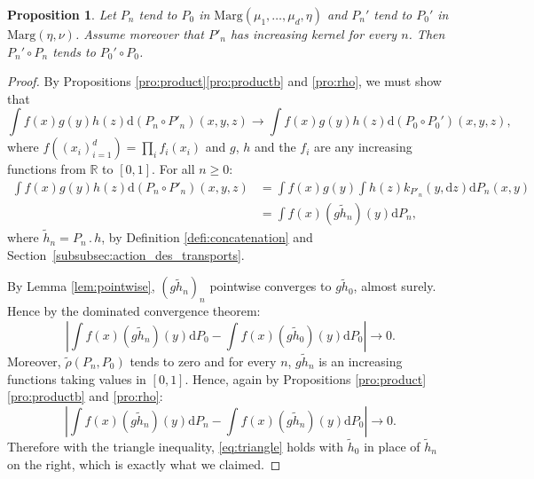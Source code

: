 \documentclass[11pt]{article}
\newcommand{\ldot}{\mathbin{.}}
\theoremstyle{plain}
\newtheorem{pro}[them]{Proposition}
\theoremstyle{definition}
\newcommand{\dd}{\mathrm{d}}
\newcommand{\ma}{\mathrm{Marg}}
\newcommand{\R}{\mathbb{R}}
\begin{document}
\begin{pro}\label{pro:continuity}
Let $P_n$ tend to $P_0$ in $\ma(\mu_1,\ldots,\mu_d,\eta)$ and $P_n'$ tend to $P_0'$ in $\ma(\eta,\nu)$. Assume moreover that $P'_n$ has increasing kernel for every $n$. Then $P_n'\circ P_n$ tends to $P_0'\circ P_0$.
\end{pro}

\begin{proof}
By Propositions \ref{pro:product}\eqref{pro:productb} and \ref{pro:rho}, we must show that\vspace*{-3pt}
\[
\int f(x)g(y)h(z)\dd (P_n\circ P'_n)(x,y,z)\to \int f(x)g(y)h(z)\dd (P_0\circ P_0')(x,y,z),
\]
where $f((x_i)_{i=1}^d)=\prod_if_i(x_i)$ and $g$, $h$ and the $f_i$ are any increasing functions from $\R$ to $[0,1]$. For all $n\geqslant0$:
\begin{align*}
\int f(x)g(y)h(z)\dd (P_n\circ P'_n)(x,y,z)&=\int f(x)g(y)\int h(z) k_{P'_n}(y,\dd z)\dd P_n(x,y)\\
&=\int f(x)(g\tilde h_n)(y)\dd P_n,
\end{align*}
where $\tilde h_n=P_{n}{}\ldot h$, by Definition \ref{defi:concatenation} and Section~\ref{subsubsec:action_des_transports}.

By Lemma \ref{lem:pointwise}, $(g\tilde{h}_n)_n$ pointwise converges to $g\tilde{h}_0$, almost surely. Hence by the dominated convergence theorem:
\[\left|\int f(x)(g\tilde h_n)(y)\dd P_0-\int f(x)(g\tilde h_0)(y)\dd P_0\right|\to0.\]
Moreover, $\tilde{\rho}(P_n,P_0)$ tends to zero and for every $n$, $g\tilde h_n$ is an increasing functions taking values in $[0,1]$. Hence, again by Propositions \ref{pro:product}\eqref{pro:productb} and \ref{pro:rho}:
\begin{equation}\label{eq:triangle}
\left|\int f(x)(g \tilde h_n)(y)\dd P_n-\int f(x)(g \tilde h_n)(y)\dd P_0\right|\to0.
\end{equation}
Therefore with the triangle inequality, \eqref{eq:triangle} holds with $\tilde h_0$ in place of $\tilde h_n$ on the right,
which is exactly what we claimed.
\end{proof}
\end{document}
